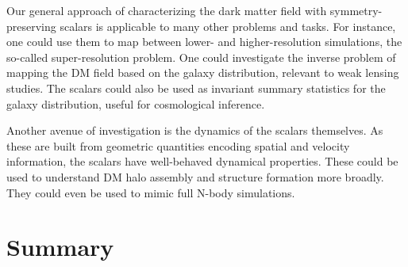 Our general approach of characterizing the dark matter field with symmetry-preserving scalars is applicable to many other problems and tasks.
For instance, one could use them to map between lower- and higher-resolution simulations, the so-called super-resolution problem.
One could investigate the inverse problem of mapping the DM field based on the galaxy distribution, relevant to weak lensing studies.
The scalars could also be used as invariant summary statistics for the galaxy distribution, useful for cosmological inference.

Another avenue of investigation is the dynamics of the scalars themselves.
As these are built from geometric quantities encoding spatial and velocity information, the scalars have well-behaved dynamical properties.
These could be used to understand DM halo assembly and structure formation more broadly.
They could even be used to mimic full N-body simulations.


\section{Summary}
\label{sec:summary_eqcosmo}

